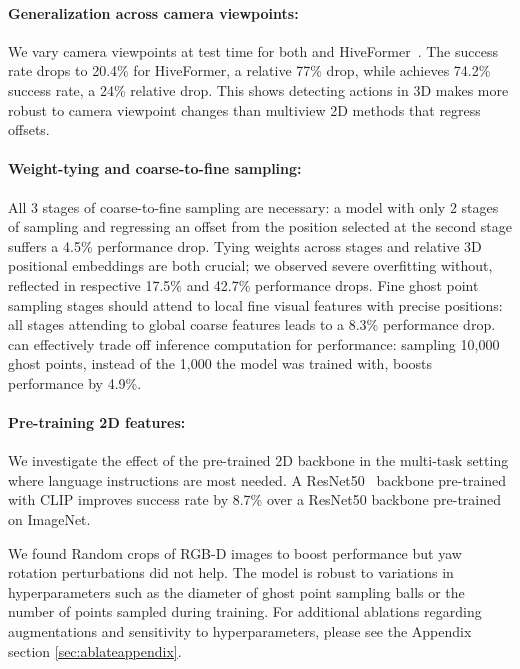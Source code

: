 \paragraph{Generalization across camera viewpoints:}  We vary camera viewpoints at test time for both \model{} and HiveFormer~\cite{guhur2023instruction}.  The success rate drops to 20.4\% for HiveFormer, a relative 77\% drop, while \model{} achieves 74.2\% success rate, a 24\% relative drop. This shows detecting actions in 3D makes \model{} more robust to camera viewpoint changes than multiview 2D methods that regress offsets. 

\paragraph{Weight-tying and coarse-to-fine sampling:} All 3 stages of coarse-to-fine sampling are necessary: a model with only 2 stages of sampling and regressing an offset from the position selected at the second stage suffers a 4.5\% performance drop. Tying weights across stages and relative 3D positional embeddings are both crucial; we observed severe overfitting without, reflected in respective 17.5\% and 42.7\% performance drops.
Fine ghost point sampling stages should attend to local fine visual features with precise positions: all stages attending to global coarse features leads to a 8.3\% performance drop. 
\model{} can effectively trade off inference computation for performance: sampling 10,000 ghost points, instead of the 1,000 the model was trained with, boosts performance by 4.9\%.


\paragraph{Pre-training 2D features:} We investigate the effect of the pre-trained 2D backbone in the multi-task setting where language instructions are most needed. A ResNet50~\cite{radford2021learning} backbone pre-trained with CLIP improves success rate by 8.7\% over a ResNet50 backbone pre-trained on ImageNet. 



We found Random crops of RGB-D images to boost performance but yaw rotation perturbations did not help. The model  is robust to variations in hyperparameters such as the diameter of ghost point sampling balls  or the number of points sampled during training. For additional ablations regarding augmentations and sensitivity to hyperparameters, please see the Appendix section \ref{sec:ablateappendix}. 


